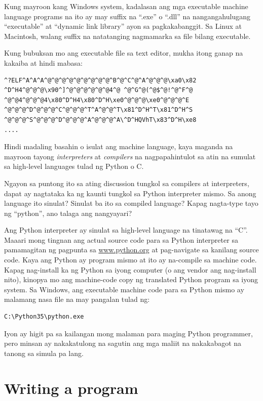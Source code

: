 \documentclass[10pt,]{book}
\begin{document}
Kung mayroon kang Windows system, kadalasan ang mga executable machine
language programs na ito ay may suffix na ``.exe'' o ``.dll'' na
nangangahulugang ``executable'' at ``dynamic link library'' ayon sa
pagkakabanggit. Sa Linux at Macintosh, walang suffix na natatanging
nagmamarka sa file bilang executable.

Kung bubuksan mo ang executable file sa text editor, mukha itong ganap
na kakaiba at hindi mabasa:

{\small
\begin{verbatim}
^?ELF^A^A^A^@^@^@^@^@^@^@^@^@^B^@^C^@^A^@^@^@\xa0\x82
^D^H4^@^@^@\x90^]^@^@^@^@^@^@4^@ ^@^G^@(^@$^@!^@^F^@
^@^@4^@^@^@4\x80^D^H4\x80^D^H\xe0^@^@^@\xe0^@^@^@^E
^@^@^@^D^@^@^@^C^@^@^@^T^A^@^@^T\x81^D^H^T\x81^D^H^S
^@^@^@^S^@^@^@^D^@^@^@^A^@^@^@^A\^D^HQVhT\x83^D^H\xe8
....
\end{verbatim}
}

Hindi madaling basahin o isulat ang machine language, kaya maganda na
mayroon tayong \emph{interpreters} at \emph{compilers} na
nagpapahintulot sa atin na sumulat sa high-level languages tulad ng
Python o C.

Ngayon sa puntong ito sa ating discussion tungkol sa compilers at
interpreters, dapat ay nagtataka ka ng kaunti tungkol sa Python
interpreter mismo. Sa anong language ito sinulat? Sinulat ba ito sa
compiled language? Kapag nagta-type tayo ng ``python'', ano talaga ang
nangyayari?

Ang Python interpreter ay sinulat sa high-level language na tinatawag na
``C''. Maaari mong tingnan ang actual source code para sa Python
interpreter sa pamamagitan ng pagpunta sa
\href{http://www.python.org}{www.python.org} at pag-navigate sa kanilang
source code. Kaya ang Python ay program mismo at ito ay na-compile sa
machine code. Kapag nag-install ka ng Python sa iyong computer (o ang
vendor ang nag-install nito), kinopya mo ang machine-code copy ng
translated Python program sa iyong system. Sa Windows, ang executable
machine code para sa Python mismo ay malamang nasa file na may pangalan
tulad ng:

{\small
\begin{verbatim}
C:\Python35\python.exe
\end{verbatim}
}

Iyon ay higit pa sa kailangan mong malaman para maging Python
programmer, pero minsan ay nakakatulong na sagutin ang mga maliit na
nakakabagot na tanong sa simula pa lang.

\section{Writing a program}\label{writing-a-program}
\end{document}
